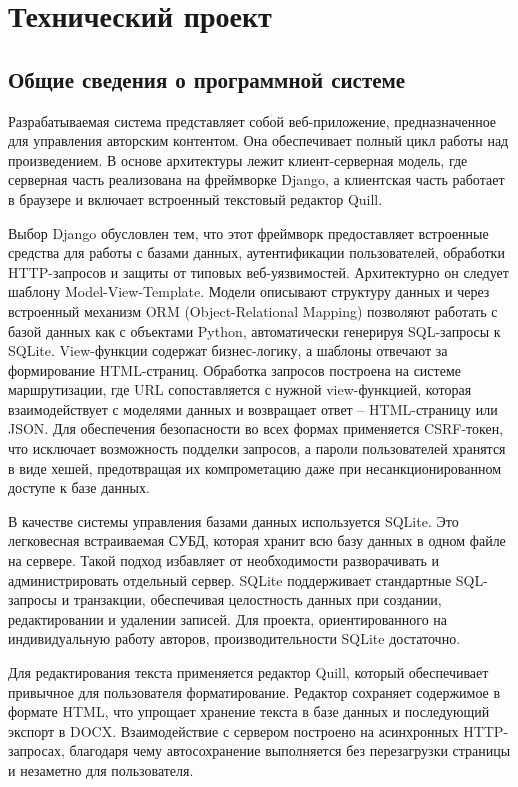\section{Технический проект}

\subsection{Общие сведения о программной системе}

Разрабатываемая система представляет собой веб-приложение, предназначенное для управления авторским контентом. Она обеспечивает полный цикл работы над произведением. В основе архитектуры лежит клиент-серверная модель, где серверная часть реализована на фреймворке Django, а клиентская часть работает в браузере и включает встроенный текстовый редактор Quill.

Выбор Django обусловлен тем, что этот фреймворк предоставляет встроенные средства для работы с базами данных, аутентификации пользователей, обработки HTTP-запросов и защиты от типовых веб-уязвимостей. Архитектурно он следует шаблону Model-View-Template. Модели описывают структуру данных и через встроенный механизм ORM (Object-Relational Mapping) позволяют работать с базой данных как с объектами Python, автоматически генерируя SQL-запросы к SQLite. View-функции содержат бизнес-логику, а шаблоны отвечают за формирование HTML-страниц. Обработка запросов построена на системе маршрутизации, где URL сопоставляется с нужной view-функцией, которая взаимодействует с моделями данных и возвращает ответ -- HTML-страницу или JSON. Для обеспечения безопасности во всех формах применяется CSRF-токен, что исключает возможность подделки запросов, а пароли пользователей хранятся в виде хешей, предотвращая их компрометацию даже при несанкционированном доступе к базе данных.

В качестве системы управления базами данных используется SQLite. Это легковесная встраиваемая СУБД, которая хранит всю базу данных в одном файле на сервере. Такой подход избавляет от необходимости разворачивать и администрировать отдельный сервер. SQLite поддерживает стандартные SQL-запросы и транзакции, обеспечивая целостность данных при создании, редактировании и удалении записей. Для проекта, ориентированного на индивидуальную работу авторов, производительности SQLite достаточно.

Для редактирования текста применяется редактор Quill, который обеспечивает привычное для пользователя форматирование. Редактор сохраняет содержимое в формате HTML, что упрощает хранение текста в базе данных и последующий экспорт в DOCX. Взаимодействие с сервером построено на асинхронных HTTP-запросах, благодаря чему автосохранение выполняется без перезагрузки страницы и незаметно для пользователя.

